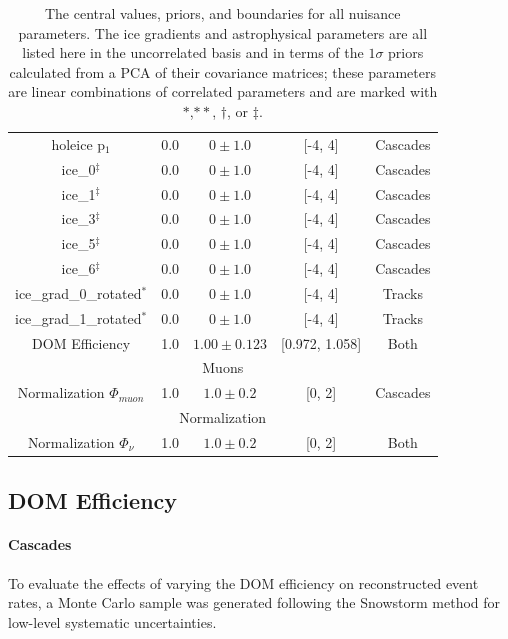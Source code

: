 \documentclass[main.tex]{subfiles}
\begin{document}
\begin{table}
\begin{tabular}{c | cccc}
        holeice p$_{1}$ & 0.0 & $0\pm 1.0$ & [-4, 4]&Cascades  \\
        ice\_0$^{\ddag}$ & 0.0 & $0\pm 1.0$ & [-4, 4]&Cascades \\
        ice\_1$^{\ddag}$ & 0.0 & $0\pm 1.0$ & [-4, 4]&Cascades \\
        ice\_3$^{\ddag}$ & 0.0 & $0\pm 1.0$ & [-4, 4]&Cascades \\
        ice\_5$^{\ddag}$ & 0.0 & $0\pm 1.0$ & [-4, 4]&Cascades \\
        ice\_6$^{\ddag}$ & 0.0 & $0\pm 1.0$ & [-4, 4]&Cascades \\
        ice\_grad\_0\_rotated$^{*}$ & 0.0 & $0\pm 1.0$ & [-4, 4] & Tracks  \\
        ice\_grad\_1\_rotated$^{*}$ & 0.0 & $0\pm 1.0$ & [-4, 4]& Tracks  \\
        DOM Efficiency & 1.0 & $1.00\pm0.123$ & [0.972, 1.058] & Both \\
        \multicolumn{5}{c}{Muons} \\\hline
        Normalization $\Phi_{muon}$ & 1.0 & $1.0\pm0.2$ & [0, 2] & Cascades  \\       
        \multicolumn{5}{c}{Normalization} \\\hline
        Normalization $\Phi_{\nu}$ & 1.0 & $1.0\pm0.2$ & [0, 2] & Both \\       
    \end{tabular}
    \caption{The central values, priors, and boundaries for all nuisance parameters. The ice gradients and astrophysical parameters are all listed here in the uncorrelated basis and in terms of the $1\sigma$ priors calculated from a PCA of their covariance matrices; these parameters are linear combinations of correlated parameters and are marked with $*$,$**$, $\dag$, or $\ddag$.}\label{table:daemon_table}
\end{table}


\subsection{DOM Efficiency}\label{subsect:domeff}

\paragraph{Cascades}

To evaluate the effects of varying the DOM efficiency on reconstructed event rates, a Monte Carlo sample was generated following the Snowstorm method for low-level systematic uncertainties.
\end{document}
